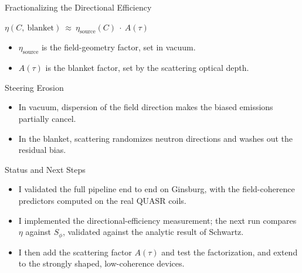 \documentclass[11pt,aspectratio=169]{beamer}
\begin{document}
\begin{frame}{Fractionalizing the Directional Efficiency}
  \vfill
  \begin{center}\Large
    $\eta(C,\ \text{blanket})\ \approx\ \eta_{\text{source}}(C)\ \cdot\ A(\tau)$
  \end{center}
  \vfill
  \begin{itemize}
    \item $\eta_{\text{source}}$ is the field-geometry factor, set in vacuum.
    \item $A(\tau)$ is the blanket factor, set by the scattering optical depth.
  \end{itemize}
\end{frame}

\begin{frame}{Steering Erosion}
  \begin{itemize}
    \item In vacuum, dispersion of the field direction makes the biased emissions partially
      cancel.
    \item In the blanket, scattering randomizes neutron directions and washes out the residual
      bias.
  \end{itemize}
\end{frame}

\begin{frame}{Status and Next Steps}
  \begin{itemize}
    \item I validated the full pipeline end to end on Ginsburg, with the field-coherence
      predictors computed on the real QUASR coils.
    \item I implemented the directional-efficiency measurement; the next run compares $\eta$
      against $S_\phi$, validated against the analytic result of Schwartz.
    \item I then add the scattering factor $A(\tau)$ and test the factorization, and extend to
      the strongly shaped, low-coherence devices.
  \end{itemize}
\end{frame}
\end{document}
